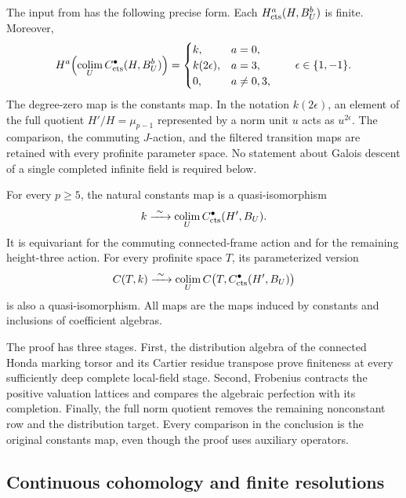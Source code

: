 The input from  has the following precise
form.  Each $H^a_{\mathrm{cts}}(H,B_U^b)$ is finite.  Moreover,
\begin{equation}\label{h3:co:completed-input}
 H^a\!\left(\operatorname*{colim}_U C^\bullet_{\mathrm{cts}}(H,B_U^b)\right)
 =
 \begin{cases}
 k,&a=0,\\
 k(2\epsilon),&a=3,\\
 0,&a\ne0,3,
 \end{cases}
 \qquad \epsilon\in\{1,-1\}.
\end{equation}
The degree-zero map is the constants map.  In the notation $k(2\epsilon)$,
an element of the full quotient $H'/H=\mu_{p-1}$ represented by a norm
unit $u$ acts as $u^{2\epsilon}$.  The comparison, the commuting $J$-action,
and the filtered transition maps are retained with every profinite
parameter space.  No statement about Galois descent of a single completed
infinite field is required below.

\begin{theorem}\label{h3:thm:coheight-one-comparison}
For every $p\geq5$, the natural constants map is a quasi-isomorphism
\begin{equation}\label{h3:co:main-constants}
 k\xrightarrow{\ \sim\ }
 \operatorname*{colim}_U C^\bullet_{\mathrm{cts}}(H',B_U).
\end{equation}
It is equivariant for the commuting connected-frame action and for the
remaining height-three action.  For every profinite space $T$, its
parameterized version
\[
 C(T,k)\xrightarrow{\ \sim\ }
 \operatorname*{colim}_U C\bigl(T,C^\bullet_{\mathrm{cts}}(H',B_U)\bigr)
\]
is also a quasi-isomorphism.  All maps are the maps induced by constants
and inclusions of coefficient algebras.
\end{theorem}

The proof has three stages.  First, the distribution algebra of the
connected Honda marking torsor and its Cartier residue transpose prove
finiteness at every sufficiently deep complete local-field stage.
Second, Frobenius contracts the positive valuation lattices and compares
the algebraic perfection with its completion.  Finally, the full norm
quotient removes the remaining nonconstant row and the distribution
target.  Every comparison in the conclusion is the original constants
map, even though the proof uses auxiliary operators.

\subsection{Continuous cohomology and finite resolutions}

